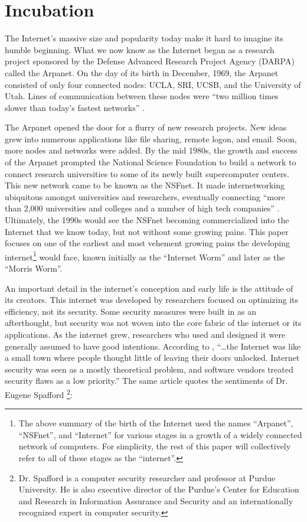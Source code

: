 \section*{Incubation}
\setcounter{page}{1}

The Internet's massive size and popularity today make it hard to imagine its
humble beginning. What we now know as the Internet began as a research project
sponsored by the Defense Advanced Research Project Agency (DARPA) called the
Arpanet. On the day of its birth in December, 1969, the Arpanet consisted of
only four connected nodes: UCLA, SRI, UCSB, and the University of Utah. Lines
of communication between these nodes were ``two million times slower than
today's fastest networks'' \cite{strawn_masterminds_2014}. 

The Arpanet opened the door for a flurry of new research projects. New ideas
grew into numerous applications like file sharing, remote logon, and email. Soon, more
nodes and networks were added. By the mid 1980s, the growth and success
of the Arpanet prompted the National Science Foundation to build a network to
connect research universities to some of its newly built supercomputer centers. 
This new network came to be known as the NSFnet.
It made internetworking ubiquitous amongst universities and researchers,
eventually connecting ``more than 2,000 universities and colleges and a
number of high tech companies'' \cite{strawn_masterminds_2014}. Ultimately, the
1990s would see the NSFnet becoming commercialized into the Internet that we
know today, but not without some growing pains. This paper focuses on one of the
earliest and most vehement growing pains the developing internet\footnote
{
The above summary of the
birth of the Internet used the names ``Arpanet'', ``NSFnet'', and ``Internet''
for various stages in a growth of a widely connected network of computers. For
simplicity, the rest of this paper will collectively refer to all of these
stages as the ``internet''.
} 
would face,
known initially as the ``Internet Worm'' and later as the ``Morris Worm''.


An important detail in the internet's conception and early life is the
attitude of its creators.
This internet was developed by researchers focused on
optimizing its efficiency, not its security. Some security
measures were built in as an afterthought, but security was not woven into
the core fabric of the internet or its applications. As the internet
grew, researchers who used and designed
it were generally assumed to have good intentions. According to
\cite{lee_washpost_2013}, ``\ldots the Internet was like a small town where
people thought little of leaving their doors unlocked. Internet security was
seen as a mostly theoretical problem, and software vendors treated security
flaws as a low priority.'' The same article quotes the sentiments of Dr. Eugene
Spafford \footnote{
Dr. Spafford is a computer security researcher and professor at Purdue
University. He is also executive director of the Purdue's Center for Education
and Research in Information Assurance and Security and an internationally
recognized expert in computer security.}:


